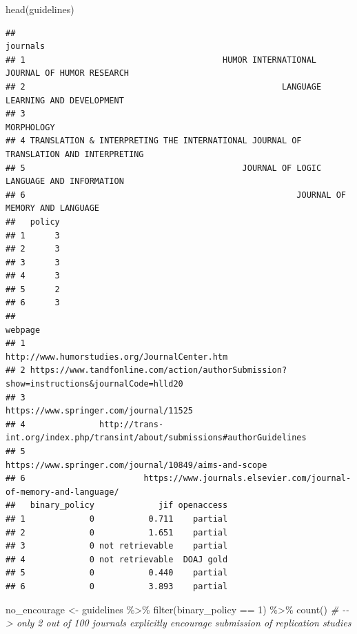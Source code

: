 \documentclass[]{elsarticle} %
\newenvironment{Shaded}{\begin{snugshade}}{\end{snugshade}}
\newcommand{\CommentTok}[1]{\textcolor[rgb]{0.56,0.35,0.01}{\textit{#1}}}
\newcommand{\DecValTok}[1]{\textcolor[rgb]{0.00,0.00,0.81}{#1}}
\newcommand{\FunctionTok}[1]{\textcolor[rgb]{0.00,0.00,0.00}{#1}}
\newcommand{\NormalTok}[1]{#1}
\newcommand{\OtherTok}[1]{\textcolor[rgb]{0.56,0.35,0.01}{#1}}
\newcommand{\SpecialCharTok}[1]{\textcolor[rgb]{0.00,0.00,0.00}{#1}}
\begin{document}
\begin{Shaded}
\begin{Highlighting}[]
\FunctionTok{head}\NormalTok{(guidelines)}
\end{Highlighting}
\end{Shaded}

\begin{verbatim}
##                                                                               journals
## 1                                        HUMOR INTERNATIONAL JOURNAL OF HUMOR RESEARCH
## 2                                                    LANGUAGE LEARNING AND DEVELOPMENT
## 3                                                                           MORPHOLOGY
## 4 TRANSLATION & INTERPRETING THE INTERNATIONAL JOURNAL OF TRANSLATION AND INTERPRETING
## 5                                            JOURNAL OF LOGIC LANGUAGE AND INFORMATION
## 6                                                       JOURNAL OF MEMORY AND LANGUAGE
##   policy
## 1      3
## 2      3
## 3      3
## 4      3
## 5      2
## 6      3
##                                                                                    webpage
## 1                                            http://www.humorstudies.org/JournalCenter.htm
## 2 https://www.tandfonline.com/action/authorSubmission?show=instructions&journalCode=hlld20
## 3                                                   https://www.springer.com/journal/11525
## 4               http://trans-int.org/index.php/transint/about/submissions#authorGuidelines
## 5                                    https://www.springer.com/journal/10849/aims-and-scope
## 6                        https://www.journals.elsevier.com/journal-of-memory-and-language/
##   binary_policy             jif openaccess
## 1             0           0.711    partial
## 2             0           1.651    partial
## 3             0 not retrievable    partial
## 4             0 not retrievable  DOAJ gold
## 5             0           0.440    partial
## 6             0           3.893    partial
\end{verbatim}

\begin{Shaded}
\begin{Highlighting}[]
\NormalTok{no\_encourage }\OtherTok{\textless{}{-}}\NormalTok{ guidelines }\SpecialCharTok{\%\textgreater{}\%} 
  \FunctionTok{filter}\NormalTok{(binary\_policy }\SpecialCharTok{==} \DecValTok{1}\NormalTok{) }\SpecialCharTok{\%\textgreater{}\%} 
  \FunctionTok{count}\NormalTok{() }
\CommentTok{\# {-}{-}\textgreater{} only 2 out of 100 journals explicitly encourage submission of replication studies}
\end{Highlighting}
\end{Shaded}
\end{document}
